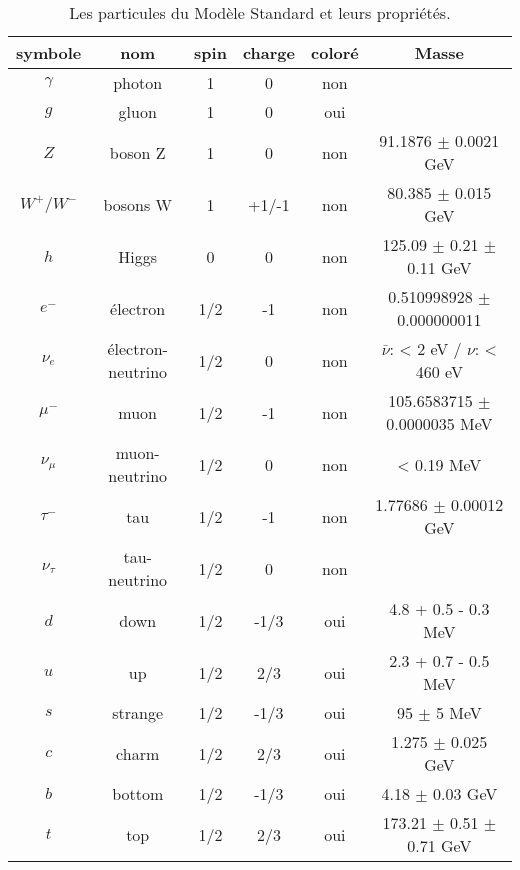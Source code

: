 \begin{table}[h!]
  \centering
  \begin{tabular}{|c|c|c|c|c|c|}
  \hline
  symbole   & nom                 & spin & charge & coloré & Masse \\ \hline
  $\gamma$  & photon              & 1    & 0     & non    &     \\ \hline
  $g$       & gluon               & 1    & 0     & oui    &     \\ \hline
  $Z$       & boson Z             & 1    & 0     & non    & 91.1876 $\pm$ 0.0021 GeV \cite{olive_review_2014} \\ \hline
  $W^+/W^-$ & bosons W            & 1    & +1/-1 & non    & 80.385 $\pm$ 0.015 GeV \cite{olive_review_2014} \\ \hline
  $h$       & Higgs               & 0    & 0     & non    & 125.09 $\pm$ 0.21 $\pm$ 0.11 GeV \cite{atlas_collaboration_combined_2015}  \\ \hline
  $e^-$     & \'electron          & 1/2  & -1    & non    & 0.510998928 $\pm$ 0.000000011 \cite{mohr_codata_2012} \\ \hline
  $\nu_e$   & \'electron-neutrino & 1/2  & 0     & non    & $\bar{\nu}$: < 2 eV \cite{olive_review_2014} / $\nu$: < 460 eV \cite{yasumi_mass_1994} \\ \hline
  $\mu^-$   & muon                & 1/2  & -1    & non    & 105.6583715 $\pm$ 0.0000035 MeV \cite{mohr_codata_2012}    \\ \hline
  $\nu_\mu$ & muon-neutrino       & 1/2  & 0     & non    & < 0.19 MeV \cite{olive_review_2014}    \\ \hline
  $\tau^-$  & tau                 & 1/2  & -1    & non    & 1.77686 $\pm$ 0.00012 GeV \cite{olive_review_2014}    \\ \hline
  $\nu_\tau$ & tau-neutrino       & 1/2  & 0     & non    &     \\ \hline
  $d$       & down                & 1/2  & -1/3  & oui    & 4.8 + 0.5 - 0.3 MeV \cite{olive_review_2014}     \\ \hline
  $u$       & up                  & 1/2  & 2/3   & oui    & 2.3 + 0.7 - 0.5 MeV \cite{olive_review_2014}    \\ \hline
  $s$       & strange             & 1/2  & -1/3  & oui    & 95 $\pm$ 5 MeV \cite{olive_review_2014}    \\ \hline
  $c$       & charm               & 1/2  & 2/3   & oui    & 1.275 $\pm$ 0.025 GeV \cite{olive_review_2014}    \\ \hline
  $b$       & bottom              & 1/2  & -1/3  & oui    & 4.18 $\pm$ 0.03 GeV \cite{olive_review_2014}    \\ \hline
  $t$       & top                 & 1/2  & 2/3   & oui    & 173.21 $\pm$ 0.51 $\pm$ 0.71 GeV \cite{olive_review_2014}    \\ \hline
\end{tabular}
\caption{Les particules du Modèle Standard et leurs propriétés.}
\label{tab:ms_particules}
\end{table}

